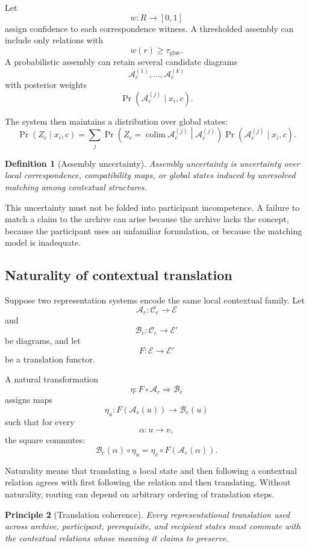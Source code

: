 \documentclass[11pt]{article}
\newtheorem{definition}{Definition}[section]
\newtheorem{principle}[definition]{Principle}
\theoremstyle{definition}
\DeclareMathOperator{\colim}{colim}
\DeclareMathOperator{\Prob}{Pr}
\newcommand{\C}{\mathcal{C}}
\newcommand{\A}{\mathcal{A}}
\newcommand{\B}{\mathcal{B}}
\begin{document}
Let
\[
w:R\to[0,1]
\]
assign confidence to each correspondence witness. A thresholded assembly can include only relations with
\[
w(r)\geq\tau_{\mathrm{glue}}.
\]
A probabilistic assembly can retain several candidate diagrams
\[
\A_c^{(1)},\ldots,\A_c^{(k)}
\]
with posterior weights
\[
\Prob(\A_c^{(j)}\mid x_i,c).
\]

The system then maintains a distribution over global states:
\[
\Prob(Z_c\mid x_i,c)
=
\sum_j
\Prob
\left(
Z_c=\colim\A_c^{(j)}
\middle|
\A_c^{(j)}
\right)
\Prob(\A_c^{(j)}\mid x_i,c).
\]

\begin{definition}[Assembly uncertainty]
Assembly uncertainty is uncertainty over local correspondence, compatibility maps, or global states induced by unresolved matching among contextual structures.
\end{definition}

This uncertainty must not be folded into participant incompetence. A failure to match a claim to the archive can arise because the archive lacks the concept, because the participant uses an unfamiliar formulation, or because the matching model is inadequate.

\subsection{Naturality of contextual translation}

Suppose two representation systems encode the same local contextual family. Let
\[
\A_c:\C_c\to\mathscr E
\]
and
\[
\B_c:\C_c\to\mathscr E'
\]
be diagrams, and let
\[
F:\mathscr E\to\mathscr E'
\]
be a translation functor.

A natural transformation
\[
\eta:F\circ\A_c\Rightarrow\B_c
\]
assigns maps
\[
\eta_u:F(\A_c(u))\to\B_c(u)
\]
such that for every
\[
\alpha:u\to v,
\]
the square commutes:
\[
\B_c(\alpha)\circ\eta_u
=
\eta_v\circ F(\A_c(\alpha)).
\]

Naturality means that translating a local state and then following a contextual relation agrees with first following the relation and then translating. Without naturality, routing can depend on arbitrary ordering of translation steps.

\begin{principle}[Translation coherence]
Every representational translation used across archive, participant, prerequisite, and recipient states must commute with the contextual relations whose meaning it claims to preserve.
\end{principle}
\end{document}
